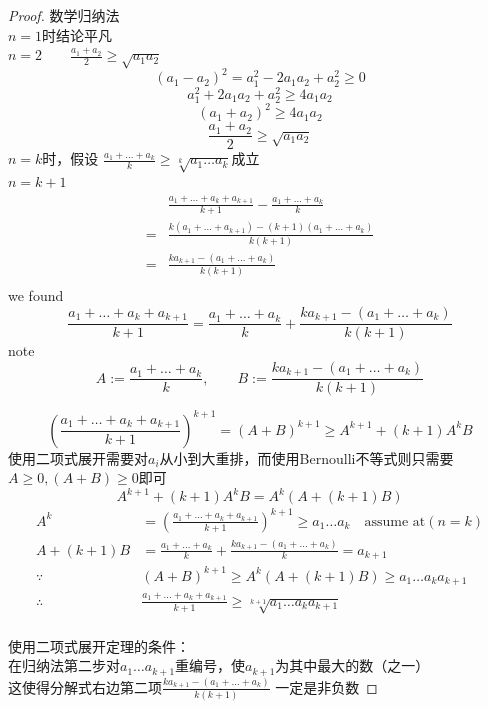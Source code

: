 \documentclass[10pt,a4paper]{book}
\begin{document}
	\begin{proof}\label{1}
	数学归纳法\\ $n=1$时结论平凡\\
	$n=2\qquad \frac{a_1+a_2}{2} \geq \sqrt{a_1a_2}$\\
	\[(a_1 - a_2)^2 = a_1^2 - 2 a_1 a_2 + a_2^2 \geq 0 \]
	\[a_1^2 + 2a_1a_2 + a_2^2 \geq 4a_1a_2\]
	\[(a_1+a_2)^2\geq 4a_1a_2\]
	\[\frac{a_1+a_2}{2}\geq \sqrt{a_1a_2}\]
	$n=k$时，假设 $\frac{a_1+\dots+a_k}{k}\geq \sqrt[k]{a_1\dots a_k}$成立\\
	$ n=k+1 $
	\begin{equation}
	\begin{aligned}
		&\frac{a_1+\dots + a_k + a_{k+1}}{k+1}-\frac{a_1+\dots +a_k}{k} \\
		=&\frac{k(a_1+\dots+a_{k+1})-(k+1)(a_1+\dots+a_k)}{k(k+1)}\\
		=&\frac{ka_{k+1}-(a_1+\dots+a_k)}{k(k+1)}\\		
	\end{aligned}
	\end{equation}
	we found 
	\[\frac{a_1+\dots + a_k + a_{k+1}}{k+1} =  \frac{a_1+\dots + a_k}{k} + \frac{ka_{k+1}-(a_1+\dots + a_k)}{k(k+1)} \]
	note \[ A := \frac{a_1+\dots + a_k}{k} , \qquad B:=\frac{ka_{k+1}-(a_1+\dots + a_k)}{k(k+1)}\]
	
	\begin{equation}
		(\frac{a_1+\dots + a_k + a_{k+1}}{k+1})^{k+1}=(A+B)^{k+1}\geq A^{k+1}+(k+1)A^k B
	\end{equation}
	使用二项式展开需要对$ a_i $从小到大重排，而使用Bernoulli不等式则只需要$ A\geq 0, (A+B)\geq 0 $即可
	\begin{equation}
		A^{k+1}+(k+1)A^k B = A^k(A+(k+1)B)
	\end{equation}
	\begin{equation}
		\begin{aligned}
			A^k& =	(\frac{a_1+\dots + a_k + a_{k+1}}{k+1})^{k+1} \geq a_1\dots a_k \quad \text{assume at}(n=k)\\
			A+(k+1)B&= \frac{a_1+\dots + a_k}{k} + \frac{ka_{k+1}-(a_1+\dots + a_k)}{k} = a_{k+1}\\
			\because& (A+B)^{k+1}\geq A^k(A+(k+1)B)\geq a_1 \dots a_k  a_{k+1}\\
			\therefore & 	\frac{a_1+\dots + a_k + a_{k+1}}{k+1} \geq  \sqrt[k+1]{a_1 \dots a_k  a_{k+1}}\\
		\end{aligned}
	\end{equation}
	
	使用二项式展开定理的条件：\\
	在归纳法第二步对$a_1 \dots a_{k+1}  $重编号，使$ a_{k+1} $为其中最大的数（之一）\\
	这使得分解式右边第二项$ \frac{ka_{k+1}-(a_1+\dots+a_k)}{k(k+1)} $ 一定是非负数
	\end{proof}
	
\end{document}
